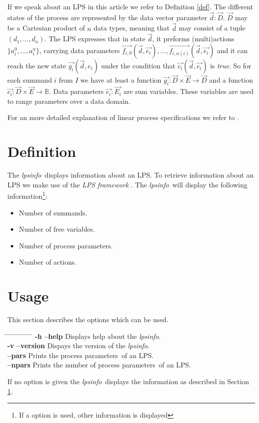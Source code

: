 \documentclass[a4paper,10pt]{article}
\theoremstyle{plain}
\theoremstyle{definition}
\newcommand{\lps}{linear process specification}
\newcommand{\tool}{\textit{lpsinfo}}
\newcommand{\ti}{\textit}
\newcommand{\tb}{\textbf}
\newcommand{\ovr}{\overrightarrow}
\newcommand{\pps}{process parameters}
\newcommand{\framework}{\textit{LPS framework} \cite{LPSframework}}
\newcommand{\tab}{\hspace*{5.mm} \= \hspace*{5.mm} \= \hspace*{5.mm} \= \hspace*{5.mm} \= \hspace*{5.mm} \= \hspace*{5.mm}  \= \hspace*{5.mm}  \= \hspace*{5.mm}  \= \hspace*{5.mm} \= \hspace*{5.mm} \= \hspace*{5.mm}  \= \hspace*{5.mm}  \= \hspace*{5.mm}\kill}
\begin{document}
\noindent If we speak about an LPS in this article we refer to Definition \ref{def}.  The different states
of the process are represented by the data vector parameter $\ovr{d}:\ovr{D}$. $\ovr{D}$ may be a Cartesian product of $n$ data types, meaning that $\ovr{d}$ may consist of a tuple $(d_1, \ldots, d_n)$. The LPS expresses that in state $\ovr{d}$, it preforms (multi)actions $\rbrace a_i^0, \ldots , a_i^n \rbrace$, carrying data parameters $\ovr{f_{i,0}}(\ovr{d},\ovr{e_i}), \ldots , \ovr{f_{i,n(i)}}(\ovr{d},\ovr{e_i})$ and
it can reach the new state $\ovr{g_i}(\ovr{d},e_i)$ under the condition that $\ovr{c_i}(\ovr{d},\ovr{e_i})$ is \ti{true}. So for each summand $i$ from $I$ we have at least a function $\ovr{g_i}: \ovr{D} \times \ovr{E} \rightarrow \ovr{D}$ and a function $\ovr{c_i}: \ovr{D} \times \ovr{E} \rightarrow \mathbb{B}$.
Data parameters $\ovr{e_i} : \ovr{E_i}$ are sum variables. These variables are used to range parameters over a data domain.

\noindent For an more detailed explanation of \lps s  we refer to \cite{LPS_info}.

\section{Definition}\label{Def}
The \tool\ displays information about an LPS. To retrieve information about an LPS we make use of the \framework .  The \tool\ will display the following information\footnote{If a option is used, other information is displayed}:
\begin{itemize}
\item Number of summands.
\item Number of free variables.
\item Number of process parameters.
\item Number of actions.
\end{itemize}

\section{Usage}
This section describes the options which can be used.
\begin{tabbing}
\tab
\> \tb{-h} \> \> \tb{--help} \> \> \> Displays help about the \tool .\\
\> \tb{-v} \> \> \tb{--version} \> \> \> Dispays the version of the \tool .\\
\>         \> \> \tb{--pars} \> \> \> Prints the \pps\ of an LPS.\\
\>         \> \> \tb{--npars} \> \> \> Prints the number of \pps\ of an LPS.\\
\end{tabbing}
If no option is given the \tool\ displays the information as described in Section \ref{Def}.
\end{document}
